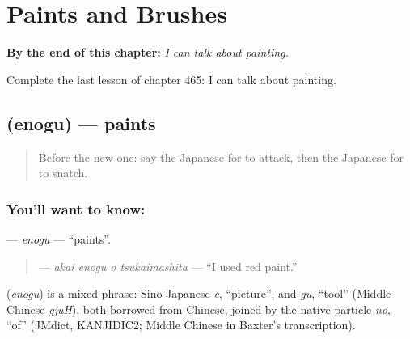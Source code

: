 
\chapter{Paints and Brushes}
\label{ch:ja-paints-and-brushes}

\begin{chapteropening}
\textbf{By the end of this chapter:} \emph{I can talk about painting.}

Complete the last lesson of chapter 465: I can talk about painting.
\end{chapteropening}

\section[\texorpdfstring{\ja{えのぐ} (enogu)}{えのぐ (enogu)}]{ (enogu) — paints}

\label{lesson:JA-C465-enogu}



\begin{quote}
Before the new one: say the Japanese for to attack, then the Japanese for to snatch.
\end{quote}

\subsection*{You'll want to know: }
\textbf{} — \emph{enogu} — \textquotedblleft{}paints\textquotedblright{}.

\begin{quote}
\textbf{  } — \emph{akai enogu o tsukaimashita} — \textquotedblleft{}I used red paint.\textquotedblright{}
\end{quote}

\begin{cousinweb}
\textbf{} (\emph{enogu}) is a mixed phrase: Sino-Japanese \emph{e}, \textquotedblleft{}picture\textquotedblright{}, and \emph{gu}, \textquotedblleft{}tool\textquotedblright{} (Middle Chinese \emph{gjuH}), both borrowed from Chinese, joined by the native particle \emph{no}, \textquotedblleft{}of\textquotedblright{} (JMdict, KANJIDIC2; Middle Chinese in Baxter's transcription).
\end{cousinweb}

